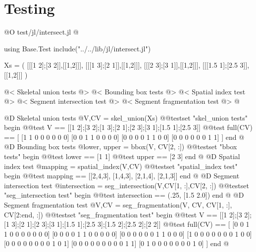 \documentclass[10pt,oneside]{article}
\begin{document}
\section{Testing}
@O test/jl/intersect.jl
@{using Base.Test
include("../../lib/jl/intersect.jl")

Xs = (
    [[[1 2];[3 2]],[[1,2]]],
    [[[1 3];[2 1]],[[1,2]]],
    [[[2 3];[3 1]],[[1,2]]],
    [[[1.5 1];[2.5 3]],[[1,2]]]
)

@< Skeletal union tests @>
@< Bounding box tests @>
@< Spatial index test @>
@< Segment intersection test @>
@< Segment fragmentation test @>
@}
@D Skeletal union tests
@{V,CV = skel_union(Xs)
@@testset "skel_union tests" begin
    @@test V == [[1 2];[3 2];[1 3];[2 1];[2 3];[3 1];[1.5 1];[2.5 3]]
    @@test full(CV) == [
        [1 1 0 0 0 0 0 0]
        [0 0 1 1 0 0 0 0]
        [0 0 0 0 1 1 0 0]
        [0 0 0 0 0 0 1 1]
    ]
end
@}
@D Bounding box tests
@{lower, upper = bbox(V, CV[2, :])
@@testset "bbox tests" begin
    @@test lower == [1 1]
    @@test upper == [2 3]
end
@}
@D Spatial index test
@{mapping = spatial_index(V,CV)
@@testset "spatial_index test" begin
    @@test mapping == [[2,4,3], [1,4,3], [2,1,4], [2,1,3]]
end
@}
@D Segment intersection test
@{intersection = seg_intersection(V,CV[1, :],CV[2, :])
@@testset "seg_intersection test" begin
    @@test intersection == (.25, [1.5 2.0])
end
@}
@D Segment fragmentation test
@{V,CV = seg_fragmentation(V, CV, CV[1, :], CV[2:end, :])
@@testset "seg_fragmentation test" begin
    @@test V == [[1 2];[3 2];[1 3];[2 1];[2 3];[3 1];[1.5 1];[2.5 3];[1.5 2];[2.5 2];[2 2]]
    @@test full(CV) == [
        [0 0 1 1 0 0 0 0 0 0 0]
        [0 0 0 0 1 1 0 0 0 0 0]
        [0 0 0 0 0 0 1 1 0 0 0]
        [1 0 0 0 0 0 0 0 1 0 0]
        [0 0 0 0 0 0 0 0 1 0 1]
        [0 0 0 0 0 0 0 0 0 1 1]
        [0 1 0 0 0 0 0 0 0 1 0]
    ]
end
@}
\end{document}

